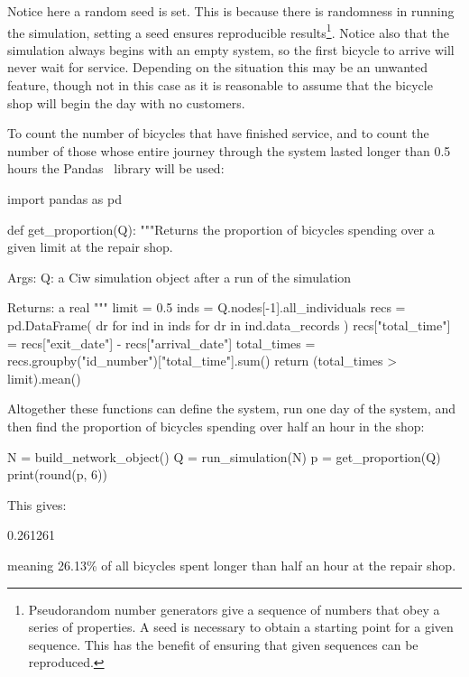 Notice here a random seed is set. This is because there is
randomness in running the simulation, setting a seed ensures reproducible
results\footnote{
Pseudorandom number generators give a sequence of numbers that obey a series of
properties. A seed is necessary to obtain a starting point for a given sequence.
This has the benefit of ensuring that given sequences can be reproduced.
}.
Notice also that the simulation always begins with an empty system, so the first
bicycle to arrive will never wait for service. Depending on the situation this
may be an unwanted feature, though not in this case as it is reasonable to
assume that the bicycle shop will begin the day with no customers.

To count the number of bicycles that have finished service, and to
count the number of those whose entire journey through the system lasted longer
than 0.5 hours the Pandas~\cite{reback2020pandas, mckinney-proc-scipy-2010}
library will be used:

\begin{pyin}
import pandas as pd


def get_proportion(Q):
    """Returns the proportion of bicycles spending over a given
    limit at the repair shop.

    Args:
        Q: a Ciw simulation object after a run of the
           simulation

    Returns:
        a real
    """
    limit = 0.5
    inds = Q.nodes[-1].all_individuals
    recs = pd.DataFrame(
        dr for ind in inds for dr in ind.data_records
    )
    recs["total_time"] = recs["exit_date"] - recs["arrival_date"]
    total_times = recs.groupby("id_number")["total_time"].sum()
    return (total_times > limit).mean()
\end{pyin}

Altogether these functions can define the system, run one day of the system, and
then find the proportion of bicycles spending over half an hour in the shop:

\begin{pyin}
N = build_network_object()
Q = run_simulation(N)
p = get_proportion(Q)
print(round(p, 6))
\end{pyin}

This gives:

\begin{pyout}
0.261261
\end{pyout}

meaning 26.13\% of all bicycles spent longer than half an hour at the repair
shop.

